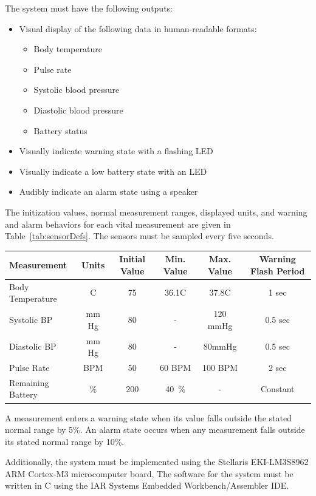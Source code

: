 \documentclass[12pt]{article} %
\begin{document}
\begin{itemize}[$$]
 \item The system must have the following outputs:
    \begin{itemize}[$\bullet$]
      \item Visual display of the following data in human-readable formats:
	\begin{itemize}
	\item Body temperature
	\item Pulse rate
	\item Systolic blood pressure
	\item Diastolic blood pressure
	\item Battery status
	\end{itemize}
      \item Visually indicate warning state with a flashing LED
      \item Visually indicate a low battery state with an LED
      \item Audibly indicate an alarm state using a speaker
    \end{itemize}
\end{itemize}

The initization values, normal measurement ranges, displayed units, and 
warning and alarm behaviors for each vital measurement are given in 
Table~\ref{tab:sensorDefs}. The sensors must be sampled every five seconds.\\

\begin{tabular}{|l|*{5}{c}|}
	\hline
	Measurement & Units & Initial Value & Min. Value & Max. Value & Warning Flash Period \\ \hline
	Body Temperature & C & 75 & 36.1C & 37.8C & 1 sec \\ \hline
	Systolic BP  & mm Hg & 80 & - & 120 mmHg & 0.5 sec \\ \hline
	Diastolic BP & mm Hg & 80 & - & 80mmHg & 0.5 sec \\ \hline
	Pulse Rate & BPM & 50 & 60 BPM & 100 BPM & 2 sec \\ \hline
	Remaining Battery & \% & 200 & 40~\% & - & Constant \\ \hline
\end{tabular}

A measurement enters a warning state when its value falls outside the stated 
normal range by 5\%. An alarm state occurs when any measurement falls outside
 its stated normal range by 10\%.

Additionally, the system must be implemented using the Stellaris 
EKI-LM3S8962 ARM Cortex-M3 microcomputer board, The software for the system 
must be written in C using the IAR Systems Embedded Workbench/Assembler IDE.
\end{document}
